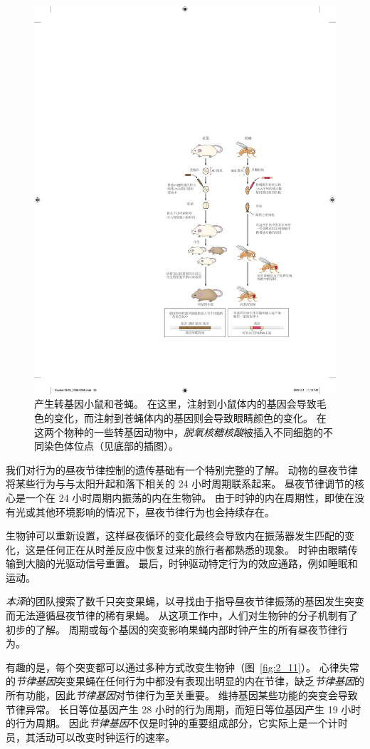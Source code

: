 \begin{figure}[htbp]
	\centering
	\includegraphics[width=0.7\linewidth]{chap02/fig_2_10}
	\caption{产生转基因小鼠和苍蝇。
		在这里，注射到小鼠体内的基因会导致毛色的变化，而注射到苍蝇体内的基因则会导致眼睛颜色的变化。
		在这两个物种的一些转基因动物中，\textit{脱氧核糖核酸}被插入不同细胞的不同染色体位点（见底部的插图）\cite{alberts2017molecular}。}
	\label{fig:2_10}
\end{figure}




我们对行为的昼夜节律控制的遗传基础有一个特别完整的了解。
动物的昼夜节律将某些行为与与太阳升起和落下相关的 24 小时周期联系起来。
昼夜节律调节的核心是一个在 24 小时周期内振荡的内在生物钟。
由于时钟的内在周期性，即使在没有光或其他环境影响的情况下，昼夜节律行为也会持续存在。


生物钟可以重新设置，这样昼夜循环的变化最终会导致内在振荡器发生匹配的变化，这是任何正在从时差反应中恢复过来的旅行者都熟悉的现象。
时钟由眼睛传输到大脑的光驱动信号重置。
最后，时钟驱动特定行为的效应通路，例如睡眠和运动。


\textit{本泽}的团队搜索了数千只突变果蝇，以寻找由于指导昼夜节律振荡的基因发生突变而无法遵循昼夜节律的稀有果蝇。
从这项工作中，人们对生物钟的分子机制有了初步的了解。
周期或每个基因的突变影响果蝇内部时钟产生的所有昼夜节律行为。


有趣的是，每个突变都可以通过多种方式改变生物钟（图~\ref{fig:2_11}）。
心律失常的\textit{节律基因}突变果蝇在任何行为中都没有表现出明显的内在节律，缺乏\textit{节律基因}的所有功能，因此\textit{节律基因}对节律行为至关重要。
维持基因某些功能的突变会导致节律异常。
长日等位基因产生 28 小时的行为周期，而短日等位基因产生 19 小时的行为周期。
因此\textit{节律基因}不仅是时钟的重要组成部分，它实际上是一个计时员，其活动可以改变时钟运行的速率。


